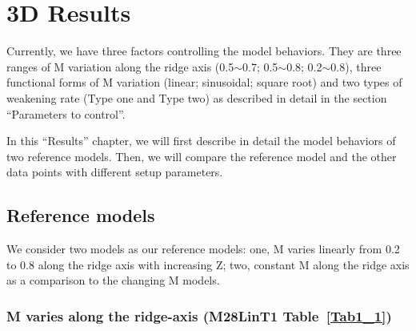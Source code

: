 \pagebreak
\section{3D Results}
Currently, we have three factors controlling the model behaviors. They are three ranges of M variation along the ridge axis (0.5$\sim$0.7; 0.5$\sim$0.8; 0.2$\sim$0.8), three functional forms of M variation (linear; sinusoidal; square root) and two types of weakening rate (Type one and Type two) as described in detail in the section ``Parameters to control''. 

In this ``Results'' chapter, we will first describe in detail the model behaviors of two reference models. Then, we will compare the reference model and the other data points with different setup parameters. %

\subsection{Reference models}
We consider two models as our reference models: one, M varies linearly from 0.2 to 0.8 along the ridge axis with increasing Z; two, constant M along the ridge axis as a comparison to the changing M models.

\subsubsection{M varies along the ridge-axis (M28LinT1 Table~\hyperref[Tab1_1]{\ref{Tab1_1}})}\label{sec_M28LinT1}

